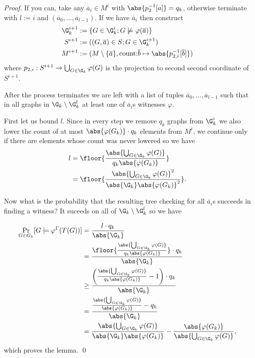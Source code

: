 \begin{proof}
If you can, take any $\overline a_i \in M^{i}$ with $\abs{p_2^{-1}[a]}=q_k$, otherwise terminate with $l:=i$ and $(\overline a_0,\dots,\overline a_{l-1})$. If we have $\overline a_i$ then construct 
\begin{align}
\G_k^{i+1}&:=\{G\in\G_k^{i};G\not\models \varphi(\overline a) \}\\
S^{i+1}&:=((G,\overline a)\in S; G\in\G_k^{i+1})\\
M^{i+1}&:=(M\setminus \{\overline a\},\text{count:}\overline b \mapsto \abs{p_{2,i}^{-1}[\overline b]})
\end{align}
where $p_{2,i}:S^{i+1}\to\bigcup_{G\in\G_k}\varphi(G)$ is the projection to second second coordinate of $S^{i+1}$.

After the process terminates we are left with a list of tuples $\overline a_0,\dots,\overline a_{l-1}$ such that in all graphs in $\G_k\setminus\G_k^{l}$ at least one of $\overline a_i$s witnesses $\varphi$.

First let us bound $l$. Since in every step we remove $q_k$ graphs from $\G_k^i$ we also lower the $\text{count}$ of at most $\abs{\varphi(G_k)}\cdot q_k$ elements from $M^{i}$, we continue only if there are elements whose count was never lowered so we have
\begin{align}
l&=\floor{\frac{\abs{\bigcup_{G\in\G_k}\varphi(G)}}{q_k\abs{\varphi(G_k)}}}\\
&=\floor{\frac{\abs{\bigcup_{G\in\G_k}\varphi(G)}^2}{\abs{\G_k}\abs{\varphi(G_k)}^2}}.
\end{align}

Now what is the probability that the resulting tree checking for all $\overline a_i$s succeeds in finding a witness? It suceeds on all of $\G_k\setminus\G_k^{l}$ so we have

\begin{align}
\Pr_{G\in G_k}[G\models \varphi^{\Gamma}(T(G))]&=\frac{l\cdot q_k}{\abs{\G_k}}\\
&=\frac{\floor{\frac{\abs{\bigcup_{G\in\G_k}\varphi(G)}}{q_k\abs{\varphi(G_k)}}}\cdot q_k}{\abs{\G_k}}\\
&\geq\frac{\left(\frac{\abs{\bigcup_{G\in\G_k}\varphi(G)}}{q_k\abs{\varphi(G_k)}}-1\right)\cdot q_k}{\abs{\G_k}}\\
&=\frac{\frac{\abs{\bigcup_{G\in\G_k}\varphi(G)}}{\abs{\varphi(G_k)}}-q_k}{\abs{\G_k}}\\
&=\frac{\abs{\bigcup_{G\in\G_k}\varphi(G)}}{\abs{\G_k}\abs{\varphi(G_k)}}-\frac{\abs{\varphi(G_k)}}{\abs{\bigcup_{G\in\G_k}\varphi(G)}},
\end{align}
which proves the lemma.
\qed
\end{proof}

